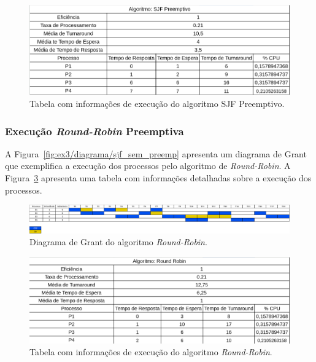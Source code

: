 \documentclass[
	12pt,				%
	oneside,   	        %
	a4paper,			%
	english,			%
	french,				%
	spanish,			%
	brazil,				%
	]{pacotes/abntex2}
\begin{document}
\begin{figure}[H]
  \centering
  \includegraphics[scale=0.5]{figuras/ex3/tabela/sjf_preemp.png}
  \caption{Tabela com informações de execução do algoritmo SJF Preemptivo.}
  \label{fig:ex3/tabela/sjf_preemp}
\end{figure}

\subsubsection{Execução \textit{Round-Robin} Preemptiva}
\label{subsubsec:rr}

A Figura~\ref{fig:ex3/diagrama/sjf_sem_preemp} apresenta um diagrama de Grant que exemplifica a execução dos processos pelo algoritmo de \textit{Round-Robin}. A Figura~\ref{fig:ex3/tabela/rr} apresenta uma tabela com informações detalhadas sobre a execução dos processos. 

\begin{figure}[H]
  \centering
  \includegraphics[scale=0.20]{figuras/ex3/diagrama/rr.png}
  \caption{Diagrama de Grant do algoritmo \textit{Round-Robin}.}
  \label{fig:ex3/diagrama/rr}
\end{figure}

\begin{figure}[H]
  \centering
  \includegraphics[scale=0.5]{figuras/ex3/tabela/rr.png}
  \caption{Tabela com informações de execução do algoritmo \textit{Round-Robin}.}
  \label{fig:ex3/tabela/rr}
\end{figure}
\end{document}
